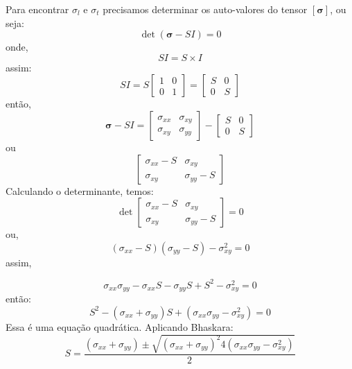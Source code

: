 \documentclass[
12pt,
a4paper,
oneside,
chapter=TITLE,
sumario=tradicional
]{abntex2}
\begin{document}
Para encontrar $\sigma_l$ e $\sigma_t$ precisamos determinar os auto-valores do tensor 	$	[\mathbf{\sigma}]$, ou seja:
\begin{equation}
\det(\boldsymbol{\sigma} - S I)=0  
\label{eq:AutoValores_001}
\end{equation}
onde,
\begin{equation*}
SI = S \times I  
\end{equation*}
assim:
\begin{equation*}
SI
= S  
\begin{bmatrix}  
	1 & 0 \\  
	0 & 1  
\end{bmatrix}
=
\begin{bmatrix}  
	S & 0 \\  
	0 & S  
\end{bmatrix}  
\end{equation*}
então,
\begin{equation*}
\boldsymbol{\sigma}-SI
= \begin{bmatrix}  
	\sigma_{xx} & \sigma_{xy}\\  
	\sigma_{xy} & \sigma_{yy}  
\end{bmatrix}
-
\begin{bmatrix}  
	S & 0\\  
	0 & S  
\end{bmatrix}  
\end{equation*}
ou
\begin{equation*}
\begin{bmatrix}  
	\sigma_{xx}-S & \sigma_{xy}\\  
	\sigma_{xy} & \sigma_{yy}-S  
\end{bmatrix}  
\end{equation*}
Calculando o determinante, temos:
\begin{equation} 
\det  
\begin{bmatrix}  
	\sigma_{xx}-S & \sigma_{xy} \\  
	\sigma_{xy} & \sigma_{yy}-S 
	\label{eq:AutoValores_002} 
\end{bmatrix}  
=0  
\end{equation}
ou,
\begin{equation*}
(\sigma_{xx}-S)(\sigma_{yy}-S)-\sigma_{xy}^2=0  
\end{equation*} 
assim,

\begin{equation*}
\sigma_{xx}\sigma_{yy}  
-\sigma_{xx}S  
-\sigma_{yy}S  
+S^2  
-\sigma_{xy}^2  
=0  
\end{equation*}
então:
\begin{equation*}  
S^2  
-(\sigma_{xx}+\sigma_{yy})S  
+  
(\sigma_{xx}\sigma_{yy}-\sigma_{xy}^2)  
=0  
\end{equation*}
Essa é uma equação quadrática. Aplicando Bhaskara:
\begin{equation*} 
S=  
\frac{  
	(\sigma_{xx}+\sigma_{yy})  
	\pm  
	\sqrt{  
		(\sigma_{xx}+\sigma_{yy})^2	
		4(\sigma_{xx}\sigma_{yy}-\sigma_{xy}^2)  
	}  
}{2}  
\end{equation*}
\end{document}
